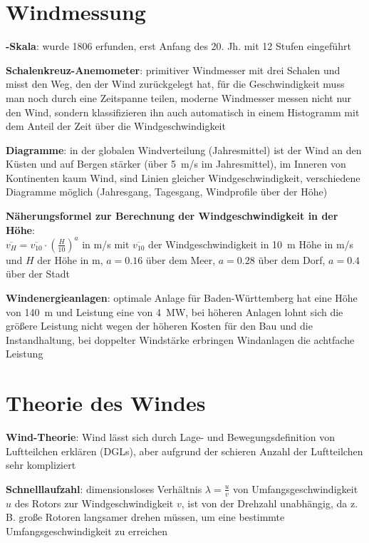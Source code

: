 \section{%
    Windmessung%
}

\textbf{-Skala}:
wurde 1806 erfunden, erst Anfang des 20. Jh. mit 12 Stufen eingeführt

\textbf{Schalenkreuz-Anemometer}:
primitiver Windmesser mit drei Schalen
und misst den Weg, den der Wind zurückgelegt hat,
für die Geschwindigkeit muss man noch durch eine Zeitspanne teilen,
moderne Windmesser messen nicht nur den Wind,
sondern klassifizieren ihn auch automatisch in einem Histogramm mit dem Anteil der Zeit
über die Windgeschwindigkeit

\textbf{Diagramme}:
in der globalen Windverteilung (Jahresmittel) ist der Wind an den Küsten und auf Bergen stärker
(über \SI{5}{\meter/\second} im Jahresmittel),
im Inneren von Kontinenten kaum Wind,
 sind Linien gleicher Windgeschwindigkeit,
verschiedene Diagramme möglich
(Jahresgang, Tagesgang, Windprofile über der Höhe)

\textbf{Näherungsformel zur Berechnung der Windgeschwindigkeit in der Höhe}:\\
$\overline{v_H} = \overline{v_{10}} \cdot \left(\frac{H}{10}\right)^a$
in \si{\meter/\second} mit $\overline{v_{10}}$ der Windgeschwindigkeit in \SI{10}{\meter} Höhe
in \si{\meter/\second} und $H$ der Höhe in \si{\meter},
$a = \num{0.16}$ über dem Meer,
$a = \num{0.28}$ über dem Dorf,
$a = \num{0.4}$ über der Stadt

\textbf{Windenergieanlagen}:
optimale Anlage für Baden-Württemberg hat eine
Höhe von \SI{140}{\meter} und Leistung eine von \SI{4}{\mega\watt},
bei höheren Anlagen lohnt sich die größere Leistung nicht wegen der höheren Kosten für den
Bau und die Instandhaltung,
bei doppelter Windstärke erbringen Windanlagen die achtfache Leistung

\pagebreak

\section{%
    Theorie des Windes%
}

\textbf{Wind-Theorie}:
Wind lässt sich durch Lage- und Bewegungsdefinition von Luftteilchen erklären (DGLs),
aber aufgrund der schieren Anzahl der Luftteilchen sehr kompliziert

\textbf{Schnelllaufzahl}:
dimensionsloses Verhältnis $\lambda = \frac{u}{v}$ von
Umfangsgeschwindigkeit $u$ des Rotors zur Windgeschwindigkeit $v$,
ist von der Drehzahl unabhängig,
da z.\,B. große Rotoren langsamer drehen müssen, um eine bestimmte Umfangsgeschwindigkeit zu
erreichen


